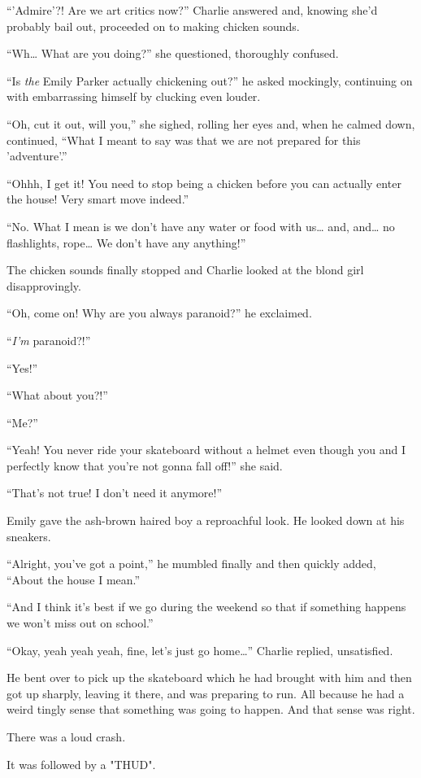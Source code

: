 “'Admire'?! Are we art critics now?” Charlie answered and, knowing she'd probably bail out, proceeded on to making chicken sounds.

“Wh… What are you doing?” she questioned, thoroughly confused.

“Is \textit{the} Emily Parker actually chickening out?” he asked mockingly, continuing on with embarrassing himself by clucking even louder.

“Oh, cut it out, will you,” she sighed, rolling her eyes and, when he calmed down, continued, “What I meant to say was that we are not prepared for this 'adventure'.”

“Ohhh, I get it! You need to stop being a chicken before you can actually enter the house! Very smart move indeed.”

“No. What I mean is we don't have any water or food with us… and, and… no flashlights, rope… We don't have any anything!”

The chicken sounds finally stopped and Charlie looked at the blond girl disapprovingly.

“Oh, come on! Why are you always paranoid?” he exclaimed.

“\textit{I'm} paranoid?!”

“Yes!”

“What about you?!”

“Me?”

“Yeah! You never ride your skateboard without a helmet even though you and I perfectly know that you're not gonna fall off!” she said.

“That's not true! I don't need it anymore!”

Emily gave the ash-brown haired boy a reproachful look. He looked down at his sneakers.

“Alright, you've got a point,” he mumbled finally and then quickly added, “About the house I mean.”

“And I think it's best if we go during the weekend so that if something happens we won't miss out on school.”

“Okay, yeah yeah yeah, fine, let's just go home…” Charlie replied, unsatisfied.

He bent over to pick up the skateboard which he had brought with him and then got up sharply, leaving it there, and was preparing to run. All because he had a weird tingly sense that something was going to happen. And that sense was right.

There was a loud crash.

It was followed by a "THUD".

